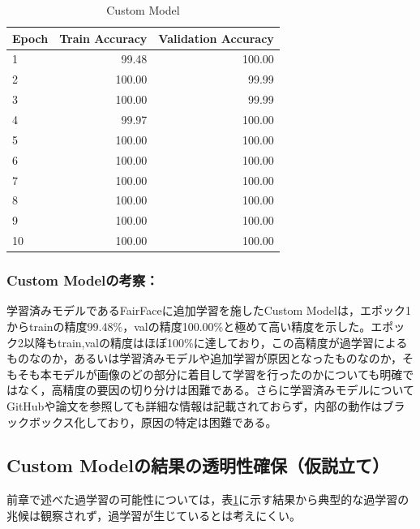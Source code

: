 \documentclass[a4paper,11pt,titlepage]{jsarticle}
\begin{document}
\begin{table}[H]
\centering
\caption{Custom Model}
\label{tab:Custom}
\begin{tabular}{lrr}
\hline
 Epoch &  Train Accuracy &  Validation Accuracy \\
\hline
     1 &           99.48 &               100.00 \\
     2 &          100.00 &                99.99 \\
     3 &          100.00 &                99.99 \\
     4 &           99.97 &               100.00 \\
     5 &          100.00 &               100.00 \\
     6 &          100.00 &               100.00 \\
     7 &          100.00 &               100.00 \\
     8 &          100.00 &               100.00 \\
     9 &          100.00 &               100.00 \\
    10 &          100.00 &               100.00 \\
\hline
\end{tabular}
\end{table}
% 

\subsubsection*{Custom Modelの考察：}
学習済みモデルであるFairFaceに追加学習を施したCustom Modelは，エポック1からtrainの精度99.48\%，valの精度100.00\%と極めて高い精度を示した。エポック2以降もtrain,valの精度はほぼ100\%に達しており，この高精度が過学習によるものなのか，あるいは学習済みモデルや追加学習が原因となったものなのか，そもそも本モデルが画像のどの部分に着目して学習を行ったのかについても明確ではなく，高精度の要因の切り分けは困難である。さらに学習済みモデルについてGitHubや論文を参照しても詳細な情報は記載されておらず，内部の動作はブラックボックス化しており，原因の特定は困難である。\par

\subsection{Custom Modelの結果の透明性確保（仮説立て）}
\label{label:仮設立て}

前章で述べた過学習の可能性については，表\ref{tab:Custom}に示す結果から典型的な過学習の兆候は観察されず，過学習が生じているとは考えにくい。\par
\end{document}
